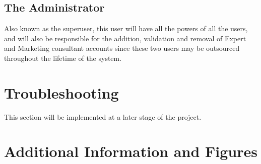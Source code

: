 \documentclass[12pt,a4paper]{article}
\begin{document}
	 	\subsection{The Administrator}
			 Also known as the superuser, this user will have all the powers of all the users, and will also be responsible for the addition, validation and removal of Expert and Marketing consultant accounts since these two users may be outsourced throughout the lifetime of the system.
			 

	 \section{Troubleshooting}
	 		 This section will be implemented at a later stage of the project.
	 	 
	 	 
	 	\section{Additional Information and Figures}
		
\end{document}
